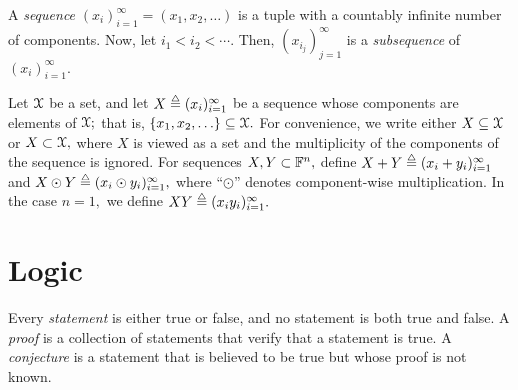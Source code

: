 \begin{defin}  \label{defin:nine5} {\rm
%
%
\label{sequencesym}%
%
A {\it sequence} $(x_i)^{\infty}_{i=1} = (x_1,x_2,\ldots)$ is a tuple with a
countably infinite number of components. Now, let $i_1 < i_2 < \cdots.$ Then, $(x_{i_j} )^{\infty}_{j=1}$ is a {\it subsequence} of
$(x_i)^{\infty}_{i=1}.$
%
}\end{defin}


Let ${\mathcal X}$ be a set, and let $X\isdef(x_i)_{i=1}^\infty$ be a sequence whose components are elements of ${\mathcal X};$ that is, $\{x_1,x_2,\ldots\}\subseteq{\mathcal X}.$
%
For convenience, we write either $X\subseteq {\mathcal X}$ or $X\subset {\mathcal X},$  where $X$ is viewed as a set and the multiplicity of the components of the sequence is ignored.
%
For sequences $X,Y\subset{\mathbb F}^n,$ define $X + Y\isdef (x_i + y_i)_{i=1}^\infty$ and $X\odot Y\isdef (x_i\odot y_i)_{i=1}^\infty,$ where ``$\odot$'' denotes component-wise multiplication.  In the case $n=1,$ we define $XY\isdef (x_i y_i)_{i=1}^\infty.$












%


\section{Logic}


Every {\it statement} is either true or false, and no statement is both true and false.
%
%
%
%
A {\it proof} is a collection of statements that verify that a statement is true.
%
%
A {\it conjecture} is a statement that is believed to be true but whose proof is not known.
%
%
%


